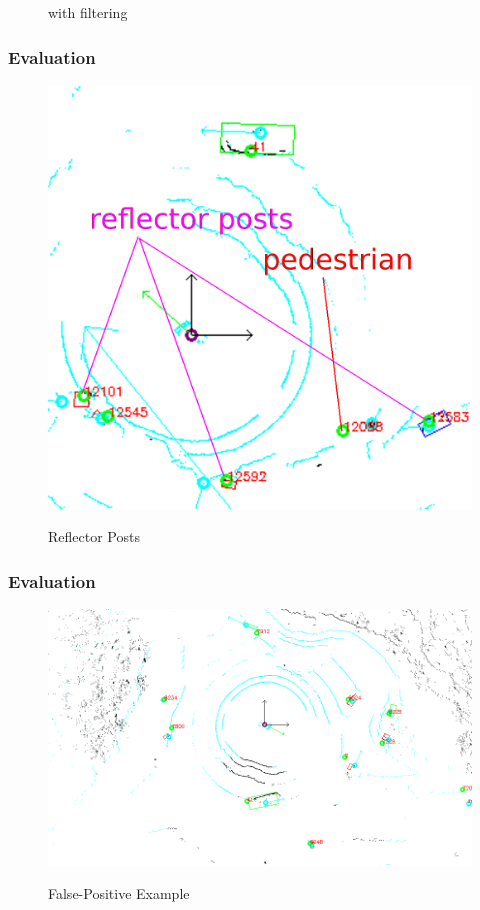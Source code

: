 \documentclass[nosymbols]{beamer}	%
\begin{document}
\begin{frame}
\begin{figure}[htb]
\begin{minipage}[t]{0.49\textwidth}
	with filtering
    \end{minipage}
    \label{conf_filter}
\end{figure}
\end{frame}




\begin{frame}
\frametitle{Evaluation}
\begin{figure}[!ht]
\begin{center}
\caption{Reflector Posts }
\includegraphics[width=\textwidth,height=0.7\textheight,keepaspectratio]{bilder/reflector_posts.png}
\label{obst_cases}
\end{center}
\end{figure}
\end{frame}

\begin{frame}
\frametitle{Evaluation}
\begin{figure}[!htb]
  \caption{False-Positive Example} 
  \centering
  \includegraphics[width=\textwidth]{bilder/false_pos1.png}
 \label{false_pos_seg_1}
\end{figure}
\end{frame}
\end{document}
